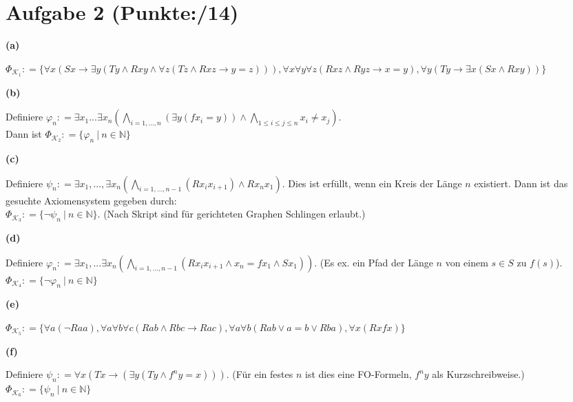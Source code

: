 \documentclass[11pt, a4paper]{article}
\newcommand{\p}{14}
\newcommand{\defgr}{\mathrel{\mathop:\!\!=}}
\begin{document}
\section*{Aufgabe 2 (Punkte:\qquad/\p)}
\textbf{(a)}
\begin{adjustwidth}{20pt}{20pt}
	$\Phi_{\mathcal{K}_1} \defgr \{\forall x(Sx \rightarrow \exists y(Ty \wedge Rxy \wedge \forall z(Tz \wedge Rxz \rightarrow y=z))),
	\forall x\forall y\forall z(Rxz \wedge Ryz \rightarrow x=y), \forall y(Ty \rightarrow \exists x(Sx \wedge Rxy))\}$
\end{adjustwidth}
\textbf{(b)}
\begin{adjustwidth}{20pt}{20pt}
	Definiere $\varphi_n \defgr \exists x_1...\exists x_n\left(\bigwedge_{i=1,...,n}(\exists y(fx_i = y)) \wedge \bigwedge_{1\leq i \leq j \leq n}x_i \neq x_j\right)$.\\ Dann ist
	$\Phi_{\mathcal{K}_2} \defgr \{ \varphi_n\ |\ n \in \mathbb{N}\}$
\end{adjustwidth}
\textbf{(c)}
\begin{adjustwidth}{20pt}{20pt}
	Definiere $\psi_n \defgr \exists x_1,...,\exists x_n(\bigwedge_{i=1,...,n-1}(Rx_ix_{i+1}) \wedge Rx_nx_1)$. Dies ist erfüllt, wenn ein Kreis der Länge $n$ existiert.
	Dann ist das gesuchte Axiomensystem gegeben durch:\\
	$\Phi_{\mathcal{K}_3} \defgr \{ \neg\psi_n\ |\ n \in \mathbb{N}\}$. (Nach Skript sind für gerichteten Graphen Schlingen erlaubt.)
\end{adjustwidth}
\textbf{(d)}
\begin{adjustwidth}{20pt}{20pt}
	Definiere $\varphi_n \defgr \exists x_1,...\exists x_n(\bigwedge_{i=1,...,n-1}(Rx_ix_{i+1} \wedge x_n=fx_1 \wedge Sx_1))$. (Es ex. ein Pfad der Länge $n$ von einem $s\in S$ zu $f(s)$). \\
	$\Phi_{\mathcal{K}_4} \defgr \{ \neg \varphi_n \ |\ n \in \mathbb{N}\}$
\end{adjustwidth}
\textbf{(e)}
\begin{adjustwidth}{20pt}{20pt}
	$\Phi_{\mathcal{K}_5} \defgr \{\forall a(\neg Raa), \forall a\forall b \forall c(Rab \wedge Rbc \rightarrow Rac), \forall a \forall b(Rab \vee a=b \vee Rba), \forall x(Rxfx)\}$
\end{adjustwidth}
\textbf{(f)}
\begin{adjustwidth}{20pt}{20pt}
	Definiere $\psi_n \defgr \forall x(Tx \rightarrow(\exists y(Ty \wedge f^ny=x)))$. (Für ein festes $n$ ist dies eine FO-Formeln, $f^ny$ als Kurzschreibweise.) \\
	$\Phi_{\mathcal{K}_6} \defgr \{ \psi_n\ |\ n \in \mathbb{N}\}$
\end{adjustwidth}
\end{document}
